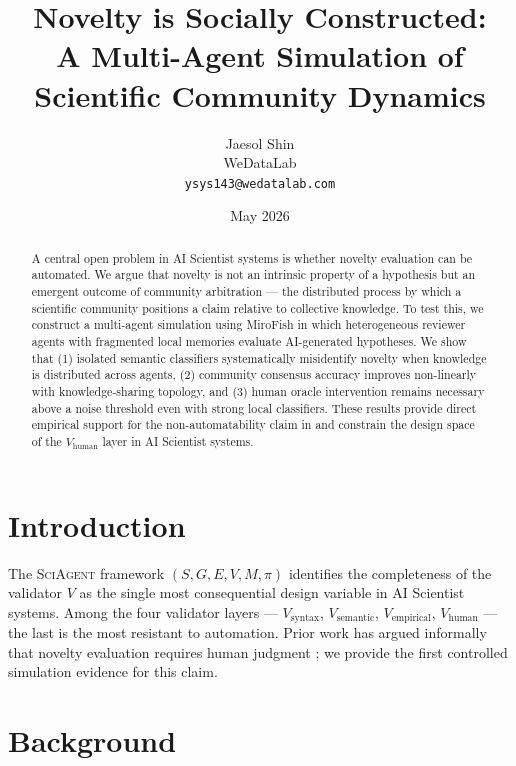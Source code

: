 \documentclass[11pt]{article}
\title{\textbf{Novelty is Socially Constructed:\\
A Multi-Agent Simulation of Scientific Community Dynamics}}
\author{
  Jaesol Shin\\
  \small{WeDataLab}\\
  \texttt{ysys143@wedatalab.com}
}
\date{May 2026}
\newcommand{\sgmvpi}{$(S, G, E, V, M, \pi)$}
\newcommand{\framework}{\textsc{SciAgent}}
\begin{document}
\maketitle

\begin{abstract}
A central open problem in AI Scientist systems is whether novelty evaluation can be automated.
We argue that novelty is not an intrinsic property of a hypothesis but an emergent outcome of
community arbitration — the distributed process by which a scientific community positions a
claim relative to collective knowledge. To test this, we construct a multi-agent simulation
using MiroFish in which heterogeneous reviewer agents with fragmented local memories evaluate
AI-generated hypotheses. We show that (1) isolated semantic classifiers systematically
misidentify novelty when knowledge is distributed across agents, (2) community consensus
accuracy improves non-linearly with knowledge-sharing topology, and (3) human oracle
intervention remains necessary above a noise threshold even with strong local classifiers.
These results provide direct empirical support for the non-automatability claim in
\citet{shin2026sciagent} and constrain the design space of the $V_\text{human}$ layer in
AI Scientist systems.
\end{abstract}

\section{Introduction}
\label{sec:intro}

The \framework{} framework \sgmvpi{} \citep{shin2026sciagent} identifies the completeness of
the validator $V$ as the single most consequential design variable in AI Scientist systems.
Among the four validator layers --- $V_\text{syntax}$, $V_\text{semantic}$,
$V_\text{empirical}$, $V_\text{human}$ --- the last is the most resistant to automation.
Prior work has argued informally that novelty evaluation requires human judgment
\citep{lu2024aiscientist}; we provide the first controlled simulation evidence for this claim.


\section{Background}
\label{sec:background}
\end{document}
